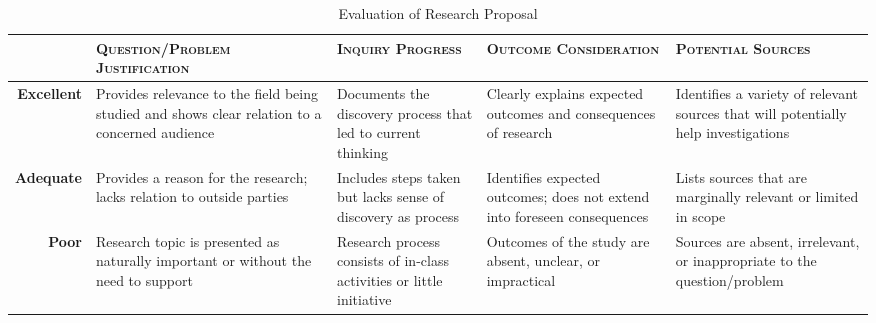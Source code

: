 \documentclass[12pt, oneside]{amsart}	%
\begin{document}
\begin{table}[b]
	\caption{Evaluation of Research Proposal}\label{tab:rubric}
	\small
\begin{tabulary}{\textwidth}{rLLLL}
	\toprule  & \textbf{\textsc{Question/Problem Justification}} & \textbf{\textsc{Inquiry Progress}} & \textbf{\textsc{Outcome Consideration}} & \textbf{\textsc{Potential Sources}}\\
\midrule	\textbf{Excellent} & Provides relevance to the field being studied and shows clear relation to a concerned audience & Documents the discovery process that led to current thinking & Clearly explains expected outcomes and consequences of research & Identifies a variety of relevant sources that will potentially help investigations \\
\midrule	\textbf{Adequate} & Provides a reason for the research; lacks relation to outside parties & Includes steps taken but lacks sense of discovery as process & Identifies expected outcomes; does not extend into foreseen consequences & Lists sources that are marginally relevant or limited in scope \\
\midrule	\textbf{Poor} & Research topic is presented as naturally important or without the need to support & Research process consists of in-class activities or little initiative & Outcomes of the study are absent, unclear, or impractical & Sources are absent, irrelevant, or inappropriate to the question/problem \\
	\bottomrule
\end{tabulary}
\end{table}
\end{document}
